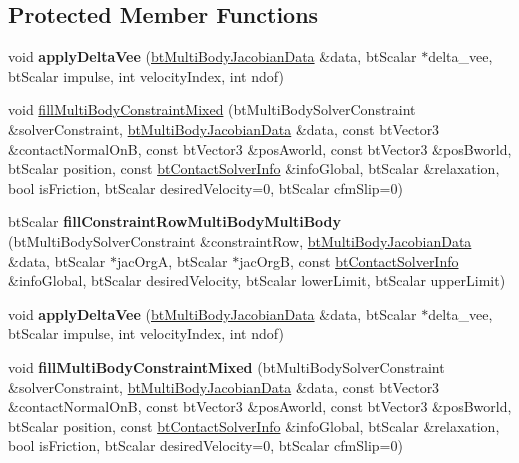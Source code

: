 \subsection*{Protected Member Functions}
\begin{DoxyCompactItemize}
\item 
\mbox{\label{classbtMultiBodyConstraint_a6a963a721e318ee010fadb4b12fbc33b}} 
void {\bfseries apply\+Delta\+Vee} (\hyperlink{structbtMultiBodyJacobianData}{bt\+Multi\+Body\+Jacobian\+Data} \&data, bt\+Scalar $\ast$delta\+\_\+vee, bt\+Scalar impulse, int velocity\+Index, int ndof)
\item 
void \hyperlink{classbtMultiBodyConstraint_a0cdd1b0d275d96edff7accc9df216370}{fill\+Multi\+Body\+Constraint\+Mixed} (bt\+Multi\+Body\+Solver\+Constraint \&solver\+Constraint, \hyperlink{structbtMultiBodyJacobianData}{bt\+Multi\+Body\+Jacobian\+Data} \&data, const bt\+Vector3 \&contact\+Normal\+OnB, const bt\+Vector3 \&pos\+Aworld, const bt\+Vector3 \&pos\+Bworld, bt\+Scalar position, const \hyperlink{structbtContactSolverInfo}{bt\+Contact\+Solver\+Info} \&info\+Global, bt\+Scalar \&relaxation, bool is\+Friction, bt\+Scalar desired\+Velocity=0, bt\+Scalar cfm\+Slip=0)
\item 
\mbox{\label{classbtMultiBodyConstraint_a8bc70e38d498ba56f1c562a004235368}} 
bt\+Scalar {\bfseries fill\+Constraint\+Row\+Multi\+Body\+Multi\+Body} (bt\+Multi\+Body\+Solver\+Constraint \&constraint\+Row, \hyperlink{structbtMultiBodyJacobianData}{bt\+Multi\+Body\+Jacobian\+Data} \&data, bt\+Scalar $\ast$jac\+OrgA, bt\+Scalar $\ast$jac\+OrgB, const \hyperlink{structbtContactSolverInfo}{bt\+Contact\+Solver\+Info} \&info\+Global, bt\+Scalar desired\+Velocity, bt\+Scalar lower\+Limit, bt\+Scalar upper\+Limit)
\item 
\mbox{\label{classbtMultiBodyConstraint_a6a963a721e318ee010fadb4b12fbc33b}} 
void {\bfseries apply\+Delta\+Vee} (\hyperlink{structbtMultiBodyJacobianData}{bt\+Multi\+Body\+Jacobian\+Data} \&data, bt\+Scalar $\ast$delta\+\_\+vee, bt\+Scalar impulse, int velocity\+Index, int ndof)
\item 
\mbox{\label{classbtMultiBodyConstraint_a0cdd1b0d275d96edff7accc9df216370}} 
void {\bfseries fill\+Multi\+Body\+Constraint\+Mixed} (bt\+Multi\+Body\+Solver\+Constraint \&solver\+Constraint, \hyperlink{structbtMultiBodyJacobianData}{bt\+Multi\+Body\+Jacobian\+Data} \&data, const bt\+Vector3 \&contact\+Normal\+OnB, const bt\+Vector3 \&pos\+Aworld, const bt\+Vector3 \&pos\+Bworld, bt\+Scalar position, const \hyperlink{structbtContactSolverInfo}{bt\+Contact\+Solver\+Info} \&info\+Global, bt\+Scalar \&relaxation, bool is\+Friction, bt\+Scalar desired\+Velocity=0, bt\+Scalar cfm\+Slip=0)

\end{DoxyCompactItemize}
